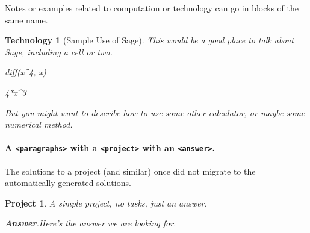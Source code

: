 \documentclass[pdflatex]{sn-jnl}
\theoremstyle{thmstyleone}%
\theoremstyle{thmstyletwo}%
\newtheorem{project}[theorem]{Project}
\theoremstyle{thmstylethree}%
\newtheorem{technology}[theorem]{Technology}
\newcommand{\blocktitlefont}{\relax}
\newcommand{\xreffont}{\relax}
\newcommand{\mono}[1]{\texttt{#1}}
\numberwithin{equation}{section}
\begin{document}
Notes or examples related to computation or technology can go in blocks of the same name.%
\begin{technology}[Sample Use of Sage]\label{section-interesting-corollary-5-3-19}%
%
This would be a good place to talk about Sage, including a cell or two.%
\begin{sageinput}
diff(x^4, x)
\end{sageinput}
\begin{sageoutput}
4*x^3
\end{sageoutput}
But you might want to describe how to use some other calculator, or maybe some numerical method.%
\end{technology}
\paragraph*{A \mono{<paragraphs>} with a \mono{<project>} with an \mono{<answer>}.}\label{section-interesting-corollary-5-3-20}%
The solutions to a project (and similar) once did not migrate to the automatically-generated solutions.%
\begin{project}\label{section-interesting-corollary-5-3-20-3}%
%
A simple project, no tasks, just an answer.%
\par\smallskip%
\noindent\textbf{\blocktitlefont Answer}.\hypertarget{section-interesting-corollary-5-3-20-3-2}{}\quad{}Here's the answer we are looking for.%
\end{project}%
%
%
\typeout{************************************************}
\typeout{************************************************}
%
\end{document}
